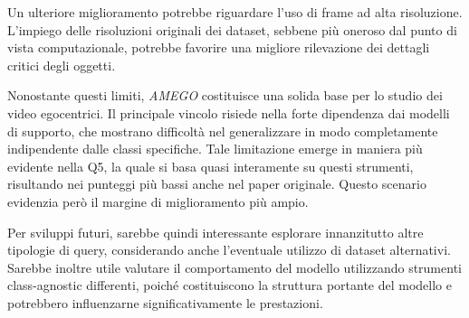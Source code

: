 Un ulteriore miglioramento potrebbe riguardare l'uso di frame ad alta risoluzione. L'impiego delle risoluzioni originali dei dataset, sebbene più oneroso dal punto di vista computazionale, 
potrebbe favorire una migliore rilevazione dei dettagli critici degli oggetti.

Nonostante questi limiti, \emph{AMEGO} costituisce una solida base per lo studio dei video egocentrici. Il principale vincolo risiede nella forte dipendenza dai modelli di supporto, che mostrano difficoltà nel generalizzare in modo completamente indipendente dalle classi specifiche. Tale limitazione emerge in maniera più evidente nella Q5, la quale si basa quasi interamente su questi strumenti, risultando nei punteggi più bassi anche nel paper originale. Questo scenario evidenzia però il margine di miglioramento più ampio.

Per sviluppi futuri, sarebbe quindi interessante esplorare innanzitutto altre tipologie di query, considerando anche l'eventuale utilizzo di dataset alternativi. Sarebbe inoltre utile valutare il comportamento del modello utilizzando strumenti class-agnostic differenti, poiché costituiscono la struttura portante del modello e potrebbero influenzarne significativamente le prestazioni.


